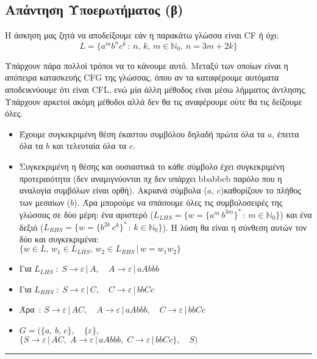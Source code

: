 \subsection{Απάντηση Υποερωτήματος (β)}
\label{ssec:Solution_3.2}
\doublespacing

Η άσκηση μας ζητά να αποδείξουμε εάν η παρακάτω γλώσσα είναι CF ή όχι:
\[L = \{a^mb^nc^k\,:\,n,\,k,\,m\in\mathbb{N}_0,\, n=3m+2k\}\]

\par
Υπάρχουν πάρα πολλοί τρόποι να το κάνουμε αυτό. Μεταξύ των οποίων είναι η απόπειρα κατασκευής CFG της γλώσσας, όπου
αν τα καταφέρουμε αυτόματα αποδεικνύουμε ότι είναι CFL, ενώ μία άλλη μέθοδος είναι μέσω λήμματος άντλησης. Υπάρχουν
αρκετοί ακόμη μέθοδοι αλλά δεν θα τις αναφέρουμε ούτε θα τις δείξουμε όλες.

\begin{tcolorbox}[colback=yellow!15!white, colframe=blue!50!white,
	fonttitle=\bfseries\Large, title = Απόδειξη με απόπειρα κατασκευής CFG]
	\begin{itemize}
		\itemsep1em

		\item Έχουμε συγκεκριμένη θέση έκαστου συμβόλου δηλαδή πρώτα όλα τα $a$, έπειτα όλα τα $b$ και τελευταία
		όλα τα $c$.

		\item Συγκεκριμένη η θέσης και ουσιαστικά το κάθε σύμβολο έχει συγκεκριμένη προτεραιότητα (δεν
		αναμιγνύονται πχ δεν υπάρχει bbabbcb παρόλο που η αναλογία συμβόλων είναι ορθή). Ακριανά
		σύμβολα ($a,\,c$)καθορίζουν το πλήθος των μεσαίων ($b$). Άρα μπορούμε να σπάσουμε όλες τις συμβολοσειρές
		της γλώσσας σε δύο μέρη: ένα αριστερό ($L_{LHS} = \{w = \{a^m\, b^{3m}\}^* \,:\, m \in \mathbb{N}_0\}
		$) και ένα δεξιό ($L_{RHS} = \{ w = \{b^{2k}\, c^k\}^* \,:\, k \in \mathbb{N}_0 \}$). Η λύση θα είναι
		η σύνθεση αυτών τον δύο και συγκεκριμένα:\\ $\{w \in L,\, w_1 \in L_{LHS},\, w_2 \in L_{RHS} \,\vert\, w =
		w_1
		w_2\}$

		\item Για $L_{LHS} \;:\; S \rightarrow \varepsilon \,|\, A,\quad A \rightarrow \varepsilon \,|\, aAbbb $

		\item Για $L_{RHS} \;:\; S \rightarrow \varepsilon \,|\, C,\quad C \rightarrow \varepsilon \,|\, bbCc $

		\item Άρα $\,:\, S \rightarrow \varepsilon \,|\, AC,\quad A \rightarrow \varepsilon \,|\, aAbbb,\quad C
		\rightarrow \varepsilon \,|\, bbCc$

		\item $G = (\{a,\,b,\,c\},\quad \{\varepsilon\},$\\
		$\{S \rightarrow \varepsilon \,|\, AC,\; A \rightarrow \varepsilon \,|\, aAbbb,\; C \rightarrow \varepsilon
		\,|\, bbCc\},\quad S)$


	\end{itemize}
\end{tcolorbox}


\begin{center}
	\noindent\rule{\linewidth}{0.5pt}
\end{center}
\clearpage
